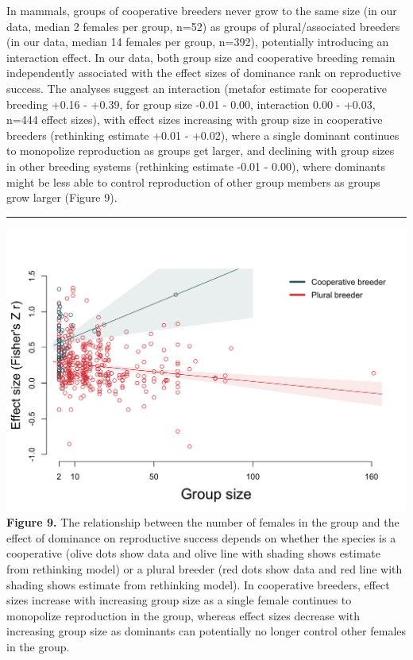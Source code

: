 \documentclass[
]{article}
\begin{document}
In mammals, groups of cooperative breeders never grow to the same size
(in our data, median 2 females per group, n=52) as groups of
plural/associated breeders (in our data, median 14 females per group,
n=392), potentially introducing an interaction effect. In our data, both
group size and cooperative breeding remain independently associated with
the effect sizes of dominance rank on reproductive success. The analyses
suggest an interaction (metafor estimate for cooperative breeding +0.16
- +0.39, for group size -0.01 - 0.00, interaction 0.00 - +0.03, n=444
effect sizes), with effect sizes increasing with group size in
cooperative breeders (rethinking estimate +0.01 - +0.02), where a single
dominant continues to monopolize reproduction as groups get larger, and
declining with group sizes in other breeding systems (rethinking
estimate -0.01 - 0.00), where dominants might be less able to control
reproduction of other group members as groups grow larger (Figure 9).

\begin{center}\rule{0.5\linewidth}{0.5pt}\end{center}

\includegraphics{ranksuccess_Fig8_effectsize_interaction_groupsize.png}
\textbf{Figure 9.} The relationship between the number of females in the
group and the effect of dominance on reproductive success depends on
whether the species is a cooperative (olive dots show data and olive
line with shading shows estimate from rethinking model) or a plural
breeder (red dots show data and red line with shading shows estimate
from rethinking model). In cooperative breeders, effect sizes increase
with increasing group size as a single female continues to monopolize
reproduction in the group, whereas effect sizes decrease with increasing
group size as dominants can potentially no longer control other females
in the group.
\end{document}
